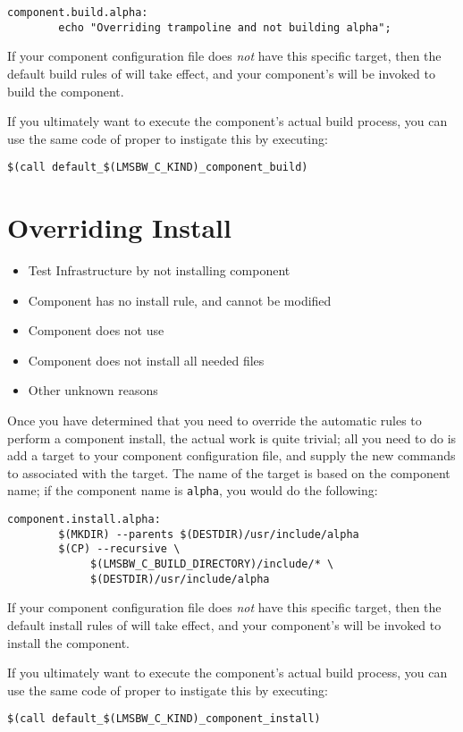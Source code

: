 \begin{verbatim}
component.build.alpha:
        echo "Overriding trampoline and not building alpha";
\end{verbatim}

If your component configuration file does \emph{not} have this
specific target, then the default build rules of \lmsbw will take
effect, and your component's \makefile will be invoked to build the
component.

If you ultimately want to execute the component's actual build
process, you can use the same code of \lmsbw proper to instigate this
by executing:

\begin{verbatim}
$(call default_$(LMSBW_C_KIND)_component_build)
\end{verbatim}


\section{Overriding Install}

\begin{itemize}
\item Test \bni Infrastructure by not installing component
\item Component \makefile has no install rule, and cannot be modified
\item Component \makefile does not use \destdir
\item Component does not install all needed files
\item Other unknown reasons
\end{itemize}


Once you have determined that you need to override the automatic rules
to perform a component install, the actual work is quite trivial; all
you need to do is add a \makefile target to your component
configuration file, and supply the new commands to associated with the
target.  The name of the target is based on the component name; if the
component name is \texttt{alpha}, you would do the following:


\begin{verbatim}
component.install.alpha:
        $(MKDIR) --parents $(DESTDIR)/usr/include/alpha
        $(CP) --recursive \
             $(LMSBW_C_BUILD_DIRECTORY)/include/* \
             $(DESTDIR)/usr/include/alpha
\end{verbatim}

If your component configuration file does \emph{not} have this
specific target, then the default install rules of \lmsbw will take
effect, and your component's \makefile will be invoked to install the
component.

If you ultimately want to execute the component's actual build
process, you can use the same code of \lmsbw proper to instigate this
by executing:

\begin{verbatim}
$(call default_$(LMSBW_C_KIND)_component_install)
\end{verbatim}



